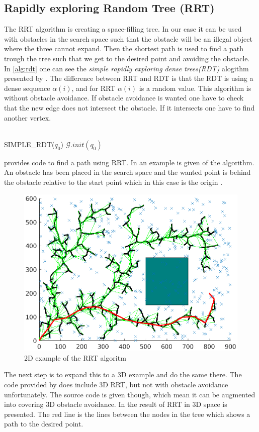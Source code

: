\subsection{Rapidly exploring Random Tree (RRT)}
The RRT algorithm is creating a space-filling tree. In our case it can be used with obstacles in the search space such that the obstacle will be an illegal object where the three cannot expand. Then the shortest path is used to find a path trough the tree such that we get to the desired point and avoiding the obstacle. In \autoref{alg:rdt} one can see the \textit{simple rapidly exploring dense trees(RDT)} alogithm presented by \cite{Lavalle}. The difference between RRT and RDT is that the RDT is using a dense sequence $\alpha(i)$, and for RRT $\alpha(i)$ is a random value. This algorithm is without obstacle avoidance. If obstacle avoidance is wanted one have to check that the new edge does not intersect the obstacle. If it intersects one have to find another vertex.\\\\
\begin{algorithm}[htbp]
 SIMPLE\_RDT($q_0$)\;
 $\mathcal{G}.init(q_0)$\;
 \caption{}
 \label{alg:rdt}
\end{algorithm}
\cite{rrt} provides code to find a path using RRT. In  an example is given of the algorithm. An obstacle has been placed in the search space and the wanted point is behind the obstacle relative to the start point which in this case is the origin \cite{rrt}.
\begin{figure}[htbp]
  \centering
  \includegraphics[width=.9\textwidth]{img/rrt2dex.eps}
  \caption{2D example of the RRT algoritm}
  \label{fig:rrt2dex}
\end{figure}
The next step is to expand this to a 3D example and do the same there. The code provided by \cite{rrt} does include 3D RRT, but not with obstacle avoidance unfortunately. The source code is given though, which mean it can be augmented into covering 3D obstacle avoidance. In  the result of RRT in 3D space is presented. The red line is the lines between the nodes in the tree which shows a path to the desired point. 

